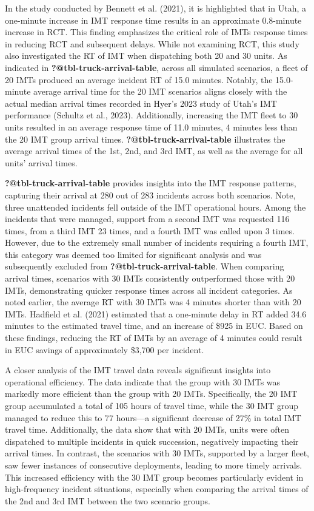 \documentclass[fancy, oneside, mastersfancy, ms]{byuthesis}
\begin{document}
In the study conducted by Bennett et al. (2021), it is highlighted that
in Utah, a one-minute increase in IMT response time results in an
approximate 0.8-minute increase in RCT. This finding emphasizes the
critical role of IMTs response times in reducing RCT and subsequent
delays. While not examining RCT, this study also investigated the RT of
IMT when dispatching both 20 and 30 units. As indicated in
\textbf{?@tbl-truck-arrival-table}, across all simulated scenarios, a
fleet of 20 IMTs produced an average incident RT of 15.0 minutes.
Notably, the 15.0-minute average arrival time for the 20 IMT scenarios
aligns closely with the actual median arrival times recorded in Hyer's
2023 study of Utah's IMT performance (Schultz et al., 2023).
Additionally, increasing the IMT fleet to 30 units resulted in an
average response time of 11.0 minutes, 4 minutes less than the 20 IMT
group arrival times. \textbf{?@tbl-truck-arrival-table} illustrates the
average arrival times of the 1st, 2nd, and 3rd IMT, as well as the
average for all units' arrival times.

\textbf{?@tbl-truck-arrival-table} provides insights into the IMT
response patterns, capturing their arrival at 280 out of 283 incidents
across both scenarios. Note, three unattended incidents fell outside of
the IMT operational hours. Among the incidents that were managed,
support from a second IMT was requested 116 times, from a third IMT 23
times, and a fourth IMT was called upon 3 times. However, due to the
extremely small number of incidents requiring a fourth IMT, this
category was deemed too limited for significant analysis and was
subsequently excluded from \textbf{?@tbl-truck-arrival-table}. When
comparing arrival times, scenarios with 30 IMTs consistently
outperformed those with 20 IMTs, demonstrating quicker response times
across all incident categories. As noted earlier, the average RT with 30
IMTs was 4 minutes shorter than with 20 IMTs. Hadfield et al. (2021)
estimated that a one-minute delay in RT added 34.6 minutes to the
estimated travel time, and an increase of \$925 in EUC. Based on these
findings, reducing the RT of IMTs by an average of 4 minutes could
result in EUC savings of approximately \$3,700 per incident.

A closer analysis of the IMT travel data reveals significant insights
into operational efficiency. The data indicate that the group with 30
IMTs was markedly more efficient than the group with 20 IMTs.
Specifically, the 20 IMT group accumulated a total of 105 hours of
travel time, while the 30 IMT group managed to reduce this to 77
hours---a significant decrease of 27\% in total IMT travel time.
Additionally, the data show that with 20 IMTs, units were often
dispatched to multiple incidents in quick succession, negatively
impacting their arrival times. In contrast, the scenarios with 30 IMTs,
supported by a larger fleet, saw fewer instances of consecutive
deployments, leading to more timely arrivals. This increased efficiency
with the 30 IMT group becomes particularly evident in high-frequency
incident situations, especially when comparing the arrival times of the
2nd and 3rd IMT between the two scenario groups.
\end{document}
